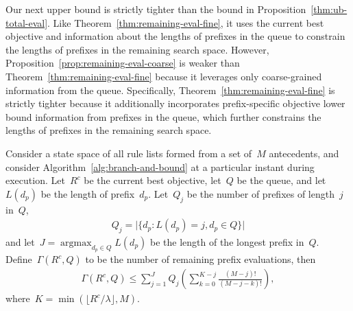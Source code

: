 \documentclass[twoside,11pt]{article}
\def\Prefix{d_p}
\def\Reg{{\lambda}}
\def\CurrentObj{{R^c}}
\def\Remaining{\Gamma}
\def\Queue{Q}
\DeclareMathOperator*{\argmax}{argmax}
\newcommand{\nn}{\nonumber}
\begin{document}
\begin{arxiv}

Our next upper bound is strictly tighter than the bound in
Proposition~\ref{thm:ub-total-eval}.
%
Like Theorem~\ref{thm:remaining-eval-fine}, it uses the
current best objective and information about
the lengths of prefixes in the queue to constrain
the lengths of prefixes in the remaining search space.
%
However, Proposition~\ref{prop:remaining-eval-coarse}
is weaker than Theorem~\ref{thm:remaining-eval-fine} because
it leverages only coarse-grained information from the queue.
%
Specifically, Theorem~\ref{thm:remaining-eval-fine} is
strictly tighter because it additionally incorporates
prefix-specific objective lower bound information from
prefixes in the queue, which further constrains
the lengths of prefixes in the remaining search space.

\begin{proposition} \hfill
\label{prop:remaining-eval-coarse}
Consider a state space of all rule lists formed from a set of~$M$ antecedents,
and consider Algorithm~\ref{alg:branch-and-bound} at a particular instant
during execution.
%
Let~$\CurrentObj$ be the current best objective, let~$\Queue$ be the queue,
and let~$L(\Prefix)$ be the length of prefix~$\Prefix$.
%
Let~$\Queue_j$ be the number of prefixes of length~$j$ in~$\Queue$,
\begin{align}
\Queue_j = \big | \{ \Prefix : L(\Prefix) = j, \Prefix \in \Queue \} \big | \nn
\end{align}
and let~${J = \argmax_{\Prefix \in \Queue} L(\Prefix)}$
be the length of the longest prefix in~$\Queue$.
%
Define~${\Remaining(\CurrentObj, \Queue)}$ to be the number of remaining
prefix evaluations, then
\begin{align}
\Remaining(\CurrentObj, \Queue)
\le \sum_{j=1}^J \Queue_j \left( \sum_{k=0}^{K-j} \frac{(M-j)!}{(M-j - k)!} \right), \nn
\end{align}
where~${K = \min(\lfloor \CurrentObj / \Reg \rfloor, M)}$.
\end{proposition}


\end{arxiv}
\end{document}
